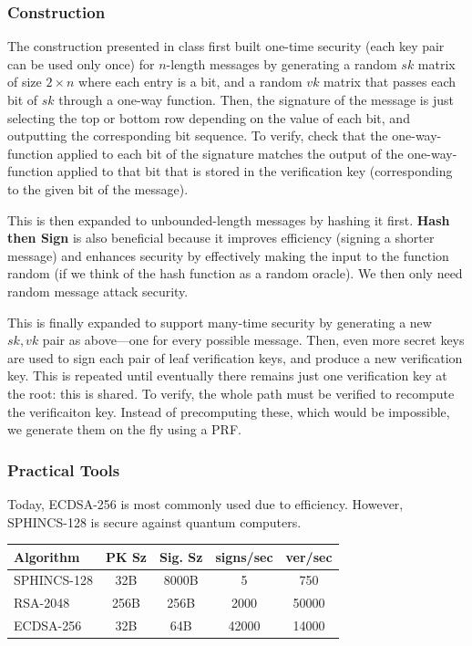 \documentclass{article}
\begin{document}
\begin{multicols*}{2}
	\subsubsection{Construction}
	The construction presented in class first built one-time security (each key pair can be used only once) for $n$-length messages by generating a random $sk$ matrix of size $2\times n$ where each entry is a bit, and a random $vk$ matrix that passes each bit of $sk$ through a one-way function. Then, the signature of the message is just selecting the top or bottom row depending on the value of each bit, and outputting the corresponding bit sequence. To verify, check that the one-way-function applied to each bit of the signature matches the output of the one-way-function applied to that bit that is stored in the verification key (corresponding to the given bit of the message). 

	This is then expanded to unbounded-length messages by hashing it first. \textbf{Hash then Sign} is also beneficial because it improves efficiency (signing a shorter message) and enhances security by effectively making the input to the function random (if we think of the hash function as a random oracle). We then only need random message attack security. 

	This is finally expanded to support many-time security by generating a new $sk, vk$ pair as above---one for every possible message. Then, even more secret keys are used to sign each pair of leaf verification keys, and produce a new verification key. This is repeated until eventually there remains just one verification key at the root: this is shared. To verify, the whole path must be verified to recompute the verificaiton key. Instead of precomputing these, which would be impossible, we generate them on the fly using a PRF. 
	
	\subsubsection{Practical Tools}
	Today, ECDSA-256 is most commonly used due to efficiency. However, SPHINCS-128 is secure against quantum computers.

	\vspace{2mm}
	\noindent\begin{tabular}{lcccc}
		Algorithm & PK Sz & Sig. Sz & signs/sec & ver/sec \\
		\hline
		SPHINCS-128 & 32B & 8000B & 5 & 750 \\
		RSA-2048 & 256B & 256B & 2000 & 50000 \\
		ECDSA-256 & 32B & 64B & 42000 & 14000 \\
		\hline
	\end{tabular}


\end{multicols*}
\end{document}
